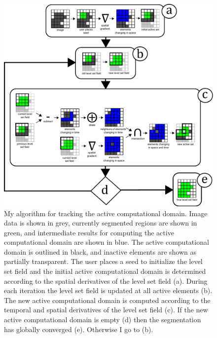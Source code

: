 \begin{figure}[t]
\centering
\includegraphics[width=6.0in]{figures/Algorithm.pdf}
\caption{My algorithm for tracking the active computational domain. Image data is shown in grey, currently segmented regions are shown in green, and intermediate results for computing the active computational domain are shown in blue. The active computational domain is outlined in black, and inactive elements are shown as partially transparent. The user places a seed to initialize the level set field and the initial active computational domain is determined according to the spatial derivatives of the level set field (a). During each iteration the level set field is updated at all active elements (b). The new active computational domain is computed according to the temporal and spatial derivatives of the level set field (c). If the new active computational domain is empty (d) then the segmentation has globally converged (e). Otherwise I go to (b). }
\label{fig:algorithm}
\end{figure}

